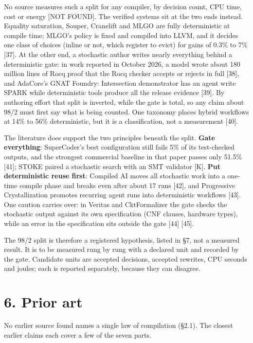 \documentclass[10pt,letterpaper]{article}
\begin{document}
No source measures such a split for any compiler, by decision count, CPU
time, cost or energy {[}NOT FOUND{]}. The verified systems sit at the
two ends instead. Equality saturation, Souper, Cranelift and MLGO are
fully deterministic at compile time; MLGO's policy is fixed and compiled
into LLVM, and it decides one class of choices (inline or not, which
register to evict) for gains of 0.3\% to 7\% {[}37{]}. At the other end,
a stochastic author writes nearly everything behind a deterministic
gate: in work reported in October 2026, a model wrote about 180 million
lines of Rocq proof that the Rocq checker accepts or rejects in full
{[}38{]}, and AdaCore's GNAT Foundry: Intersection demonstrator has an
agent write SPARK while deterministic tools produce all the release
evidence {[}39{]}. By authoring effort that split is inverted, while the
gate is total, so any claim about 98/2 must first say what is being
counted. One taxonomy places hybrid workflows at 14\% to 56\%
deterministic, but it is a classification, not a measurement {[}40{]}.

The literature does support the two principles beneath the split.
\textbf{Gate everything}: SuperCoder's best configuration still fails
5\% of its test-checked outputs, and the strongest commercial baseline
in that paper passes only 51.5\% {[}41{]}; STOKE paired a stochastic
search with an SMT validator {[}K{]}. \textbf{Put deterministic reuse
first}: Compiled AI moves all stochastic work into a one-time compile
phase and breaks even after about 17 runs {[}42{]}, and Progressive
Crystallization promotes recurring agent runs into deterministic
workflows {[}43{]}. One caution carries over: in Veritas and
CktFormalizer the gate checks the stochastic output against its own
specification (CNF clauses, hardware types), while an error in the
specification sits outside the gate {[}44{]} {[}45{]}.

The 98/2 split is therefore a registered hypothesis, listed in §7, not a
measured result. It is to be measured rung by rung with a declared unit
and recorded by the gate. Candidate units are accepted decisions,
accepted rewrites, CPU seconds and joules; each is reported separately,
because they can disagree.

\section{6. Prior art}\label{prior-art}

No earlier source found names a single law of compilation (§2.1). The
closest earlier claims each cover a few of the seven parts.
\end{document}

